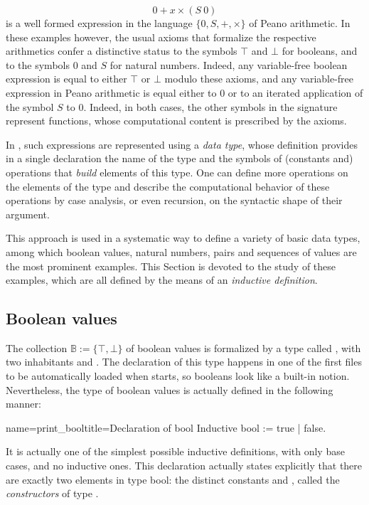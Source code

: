 \[ 0 + x \times (S\ 0) \]
is a well formed expression in the language $\{0,S, +, \times\}$ of
Peano arithmetic. In these examples however, the usual axioms that
formalize the respective arithmetics confer a distinctive status to
the symbols $\top$ and $\bot$ for booleans, and to the symbols $0$ and
$S$ for natural numbers. Indeed, any variable-free boolean expression
is equal to either $\top$ or $\bot$ modulo these axioms, and any
variable-free expression in Peano arithmetic is equal either to $0$ or
to an iterated application of the symbol $S$ to $0$. Indeed, in both
cases, the other symbols in the signature represent functions, whose
computational content is prescribed by the axioms.

In \Coq{}, such expressions are represented using a \emph{data type},
whose definition provides in a single declaration the name of the type
and the symbols of (constants and) operations that \emph{build} elements
of this type. One can define more operations on the elements of
the type and describe the computational behavior of these operations
by case analysis, or even recursion, on the syntactic shape of their
argument.

This approach is used in a systematic way to define a variety of basic
data types, among which boolean values, natural numbers, pairs and
sequences of values are the most prominent examples. This Section is
devoted to the study of these examples, which are all defined by the
means of an \emph{inductive definition}.

\subsection{Boolean values}

The collection $\mathbb{B} := \{\top, \bot\}$ of boolean values is
formalized by a type called , with two inhabitants 
and . The declaration of this type happens
in one of the first files to be automatically loaded when \Coq{} starts,
so booleans look like a built-in notion.  Nevertheless, the type of
boolean values is actually defined in the following manner:

\begin{coq}{name=print_bool}{title=Declaration of bool}
Inductive bool := true | false.
\end{coq}

It is actually one of the simplest possible inductive definitions,
with only base cases, and no inductive ones. This
declaration actually states explicitly that there are exactly two
elements in type bool: the distinct constants  and ,
called the \emph{constructors} of type .

